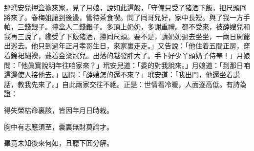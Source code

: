 那玳安兒押盒擔來家，見了月娘，說如此這般，「守備只受了猪酒下飯，把尺頭囘將來了。春梅姐讓到後邊，管待茶食喫。問了囘哥兒好，家中長短。與了我一方手帕，三錢銀子。擡盒人二錢銀子。多頂上奶奶，多謝重禮。都不受來，被薛嫂兒和我再三說了，纔受了下飯猪酒，擡囘尺頭。要不是，請奶奶過去坐坐，一兩日周爺出巡去。他只到過年正月孝哥生日，來家裏走走。」又告說：「他住着五間正房，穿着錦裙繡襖，戴着金梁冠兒。出落的越發胖大了。手下好少丫頭奶子侍奉！」月娘問：「他眞實說明年往咱家來？」玳安兒道：「委的對我說來。」月娘道：「到那日咱這邊使人接他去。」因問：「薛嫂怎的還不來？」玳安道：「我出門，他還坐着説話，教我先來了。」自此兩家交往不絶。正是：世情看冷暖，人面逐高低。有詩為證：

\begin{myquote}
得失榮枯命裏該，皆因年月日時栽。

胸中有志應須至，囊裏無財莫論才。
\end{myquote}

畢竟未知後來何如，且聽下囬分解。

